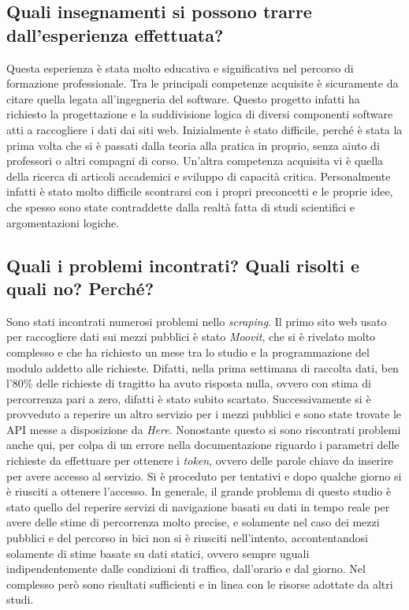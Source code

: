 \documentclass[a4paper,12pt]{article}
\begin{document}
\subsection{Quali insegnamenti si possono trarre dall'esperienza effettuata?}
Questa esperienza è stata molto educativa e significativa nel percorso di formazione professionale. Tra le principali competenze acquisite è sicuramente da citare quella legata all'ingegneria del software. Questo progetto infatti ha richiesto la progettazione e la suddivisione logica di diversi componenti software atti a raccogliere i dati dai siti web. Inizialmente è stato difficile, perché è stata la prima volta che si è passati dalla teoria alla pratica in proprio, senza aiuto di professori o altri compagni di corso. Un'altra competenza acquisita vi è quella della ricerca di articoli accademici e sviluppo di capacità critica. Personalmente infatti è stato molto difficile scontrarsi con i propri preconcetti e le proprie idee, che spesso sono state contraddette dalla realtà fatta di studi scientifici e argomentazioni logiche.

\subsection{Quali i problemi incontrati? Quali risolti e quali no? Perché?}
Sono stati incontrati numerosi problemi nello \textit{scraping}. Il primo sito web usato per raccogliere dati sui mezzi pubblici è stato \textit{Moovit}, che si è rivelato molto complesso e che ha richiesto un mese tra lo studio e la programmazione del modulo addetto alle richieste. Difatti, nella prima settimana di raccolta dati, ben l'80\% delle richieste di tragitto ha avuto risposta nulla, ovvero con stima di percorrenza pari a zero, difatti è stato subito scartato. Successivamente si è provveduto a reperire un altro servizio per i mezzi pubblici e sono state trovate le API messe a disposizione da \textit{Here}. Nonostante questo si sono riscontrati problemi anche qui, per colpa di un errore nella documentazione riguardo i parametri delle richieste da effettuare per ottenere i \textit{token}, ovvero delle parole chiave da inserire per avere accesso al servizio. Si è proceduto per tentativi e dopo qualche giorno si è riusciti a ottenere l'accesso. In generale, il grande problema di questo studio è stato quello del reperire servizi di navigazione basati su dati in tempo reale per avere delle stime di percorrenza molto precise, e solamente nel caso dei mezzi pubblici e del percorso in bici non si è riusciti nell'intento, accontentandosi solamente di stime basate su dati statici, ovvero sempre uguali indipendentemente dalle condizioni di traffico, dall'orario e dal giorno. Nel complesso però sono risultati sufficienti e in linea con le risorse adottate da altri studi.

\nocite{isfortaudimob}
\nocite{ellison2011travel}
\nocite{faghih2017hail}
\nocite{pagani2017knowledge}
\nocite{chien2003dynamic}



\end{document}
